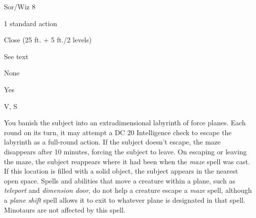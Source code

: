 
\begin{description*}
\item[Level:] Sor/Wiz 8
\item[Casting Time:] 1 standard action
\item[Range:] Close (25 ft. + 5 ft./2 levels)
\item[Duration:] See text
\item[Saving Throw:] None
\item[Spell Resistance:] Yes
\item[Components:] V, S
\end{description*}

You banish the subject into an extradimensional labyrinth of force planes. Each
round on its turn, it may attempt a DC 20 Intelligence check to escape the labyrinth
as a full-round action. If the subject doesn't escape, the maze disappears after
10 minutes, forcing the subject to leave.
On escaping or leaving the maze, the subject reappears where it had been when the
\textit{maze} spell was cast. If this location is filled with a solid object, the
subject appears in the nearest open space. Spells and abilities that move a creature
within a plane, such as \textit{teleport} and \textit{dimension door}, do not help
a creature escape a \textit{maze} spell, although a \textit{plane shift} spell
allows it to exit to whatever plane is designated in that spell. Minotaurs are
not affected by this spell.